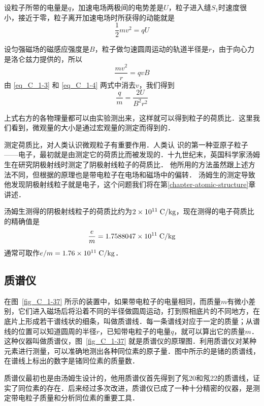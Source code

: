 设粒子所带的电量是$q$，加速电场两极间的电势差是$U$，粒子进入缝$S_1$时速度很小，接近于零，粒子离开加速电场时所获得的动能就是
\begin{equation}\label{eq_C_1-3}
\frac{1}{2}mv^2=qU    
\end{equation}

设匀强磁场的磁感应强度是$B$，粒子做匀速圆周运动的轨道半径是$r$，由于向心力是洛仑兹力提供的，所以
\begin{equation}\label{eq_C_1-4}
    \frac{mv^2}{r}=qvB
\end{equation}
由 \eqref{eq_C_1-3} 和 \eqref{eq_C_1-4} 两式中消去$v$，我们得到
\[\frac{q}{m}=\frac{2U}{B^2r^2}\]

上式右方的各物理量都可以由实验测出来，这样就可以得到粒子的荷质比．这里我们看到，微观量的大小是通过宏观量的测定而得到的．

测定荷质比，对人类认识微观粒子有重要作用．人类认
识的第一种亚原子粒子——电子，最初就是由测定它的荷质比而被发现的．十九世纪末，英国科学家汤姆生在研究阴极射线时测定了阴极射线粒子的荷质比．
他所用的方法虽然跟上述方法不同，但根据的原理也是带电粒子在电场和磁场中的偏转．
汤姆生的测定导致他发现阴极射线粒子就是电子，这个问题我们将在第\ref{chapter-atomic-structure}章讲述．

汤姆生测得的阴极射线粒子的荷质比约为$2\times10^{11}  \;\text{C}/\text{kg} $，现在测得的电子荷质比的精确值是
\[\frac{e}{m}=1.7588047\times10^{11} \;\text{C}/\text{kg}  \]
通常可取作$e/m=1.76\times10^{11} \;\text{C}/\text{kg} $．

\subsection{质谱仪}

在图~\ref{fig_C_1-37} 所示的装置中，如果带电粒子的电量相同，而质量$m$有微小差别，它们进入磁场后将沿着不同的半径做圆周运动，打到照相底片的不同地方，在底片上形成若干谱线状的细条，叫做质谱线．每一条谱线对应于一定的质量；从谱线的位置可以知道圆周的半径$r$，已知带电粒子的电量$q$，就可以算出它的质量$m$．这种仪器叫做质谱仪，图~\ref{fig_C_1-37} 就是质谱仪的原理图．利用质谱仪对某种元素进行测量，可以准确地测出各种同位素的原子量．图中所示的是锗的质谱线，在谱线上标出的数字是锗同位素的质量数．

质谱仪最初也是由汤姆生设计的，他用质谱仪首先得到了氖20和氖22的质谱线，证实了同位素的存在．后来经过多次改进，质谱仪已成了一种十分精密的仪器，是测定带电粒子质量和分析同位素的重要工具．


